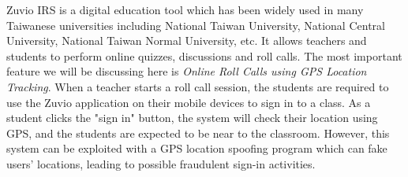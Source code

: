 Zuvio IRS \cite{zuvio-irs} is a digital education tool which has been widely used in many Taiwanese universities
including National Taiwan University, National Central University, National Taiwan Normal University, etc.
It allows teachers and students to perform online quizzes, discussions and roll calls. The most
important feature we will be discussing here is \emph{Online Roll Calls using GPS Location Tracking}.
When a teacher starts a roll call session, the students are required to use the Zuvio application
on their mobile devices to sign in to a class. As a student clicks the "sign in" button, the system will
check their location using GPS, and the students are expected to be near to the classroom. However, this
system can be exploited with a GPS location spoofing program which can fake users' locations,
leading to possible fraudulent sign-in activities.
